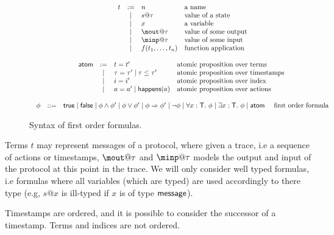 \documentclass[a4paper]{article}
\theoremstyle{remark}
\begin{document}
\begin{figure}
\[\begin{array}{c}
\begin{array}{rcll}
    t & := & n &\text{a name } \\
           & \mid & s@\tau &\text{value of a state}\\
    & \mid & x  & \text{a variable} \\
    & \mid & \mout@\tau & \text{value of some output} \\
    & \mid & \minp@\tau & \text{value of some input} \\
    & \mid & f(t_1,\dots,t_n) &\text{function application}\\
       \end{array}
\\
\\
   \begin{array}{rcll}
   \atom & := & t=t'
 & \text{atomic proposition over terms } \\
  &\mid & \tau=\tau' \mid \tau \leq \tau' &  \text{atomic proposition
  over timestamps } \\
  &\mid & i=i'  &  \text{atomic proposition
    over index } \\
  &\mid & a= a'\mid  \happens(a)  &  \text{atomic proposition
    over actions } \\
    \end{array}
\\
\\
     \begin{array}{rcll}
    \phi & ::= &  \true \mid \false \mid \phi \wedge \phi' \mid  \phi
    \vee \phi' \mid   \phi \Rightarrow \phi'\mid \neg \phi \mid
    \forall x : \T.\ \phi \mid \exists x:\T.\ \phi \mid \atom &
    \text{
    first order formula} \\
    \end{array}

\end{array}
    \]
    \caption{Syntax of first order formulas.}\label{fig:syntax}
\end{figure}


Terms $t$ may represent messages of a protocol, where given a trace,
i.e a sequence of actions or timestamps, $\mout@\tau$ and
$\minp@\tau$ models the output and input of the protocol at this
point in the trace. We will only consider well typed formulas, i.e
formulas where all variables (which are typed) are used accordingly
to there type (e.g, $s@x$ is ill-typed if $x$ is of type $\textsf{message}$).




Timestamps are ordered, and it is possible to consider the successor
of a timestamp.  Terms and indices are not ordered.
\end{document}

